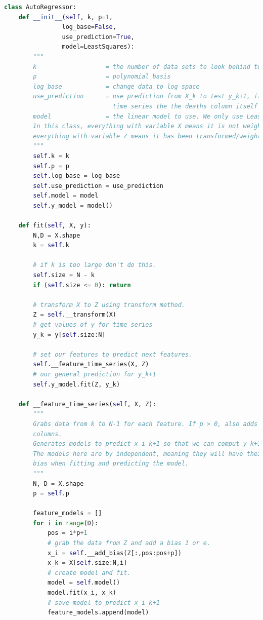 \begin{lstlisting}[language=Python, caption=AutoRegressor class implementation]
class AutoRegressor:
    def __init__(self, k, p=1, 
                log_base=False,
                use_prediction=True,
                model=LeastSquares):
        """
        k                   = the number of data sets to look behind to make next prediction
        p                   = polynomial basis
        log_base            = change data to log space
        use_prediction      = use prediction from X_k to test y_k+1, if false uses
                              time series the the deaths column itself
        model               = the linear model to use. We only use Least Squares
        In this class, everything with variable X means it is not weighted
        everything with variable Z means it has been transformed/weighted.
        """
        self.k = k
        self.p = p
        self.log_base = log_base
        self.use_prediction = use_prediction
        self.model = model
        self.y_model = model()

    def fit(self, X, y):
        N,D = X.shape
        k = self.k

        # if k is too large don't do this.
        self.size = N - k
        if (self.size <= 0): return

        # transform X to Z using transform method.
        Z = self.__transform(X)
        # get values of y for time series
        y_k = y[self.size:N]

        # set our features to predict next features.
        self.__feature_time_series(X, Z)
        # our general prediction for y_k+1
        self.y_model.fit(Z, y_k)

    def __feature_time_series(self, X, Z):
        """
        Grabs data from k to N-1 for each feature. If p > 0, also adds polynomial basis
        columns.
        Generates models to predict x_i_k+1 so that we can comput y_k+1.
        The models here are by independent, meaning they will have their own
        bias when fitting and predicting the model.
        """
        N, D = X.shape
        p = self.p

        feature_models = []
        for i in range(D):
            pos = i*p+1
            # grab the data from Z and add a bias 1 or e.
            x_i = self.__add_bias(Z[:,pos:pos+p])
            x_k = X[self.size:N,i]
            # create model and fit.
            model = self.model()
            model.fit(x_i, x_k)
            # save model to predict x_i_k+1
            feature_models.append(model)


\end{lstlisting}
